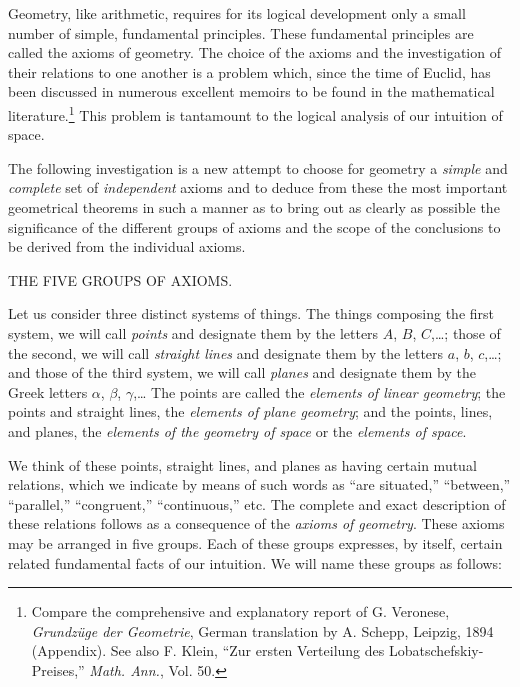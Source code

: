 \documentclass[11pt,oneside]{book}
\begin{document}
\pagestyle{headings}
\label{p0}

Geometry, like arithmetic, requires for its logical
development only a small number of simple,
fundamental principles. These fundamental principles
are called the axioms of geometry. The choice
of the axioms and the investigation of their relations
to one another is a problem which, since the time of
Euclid, has been discussed in numerous excellent
memoirs to be found in the mathematical literature.\footnote{Compare
the comprehensive and explanatory report of G. Veronese,
\textit{Grundz\"uge der Geometrie}, German translation by A. Schepp, Leipzig, 1894
(Appendix). See also F. Klein, ``Zur ersten Verteilung des Lobatschefskiy-Preises,''
\emph{Math. Ann.}, Vol. 50.}
This problem is tantamount to the logical analysis of
our intuition of space.

The following investigation is a new attempt to
choose for geometry a \emph{simple} and \emph{complete} set of \emph{independent}
axioms and to deduce from these the most important
geometrical theorems in such a manner as to
bring out as clearly as possible the significance of the
different groups of axioms and the scope of the conclusions
to be derived from the individual axioms.
\newpage
\begin{center}{\Large THE FIVE GROUPS OF AXIOMS.}\end{center}
\label{p1}

Let us consider three distinct systems of things.
The things composing the first system, we will
call \emph{points} and designate them by the letters $A$, $B$,
$C$,\ldots; those of the second, we will call \emph{straight
lines} and designate them by the letters $a$, $b$, $c$,\ldots;
and those of the third system, we will call \emph{planes} and
designate them by the Greek letters $\alpha$, $\beta$, $\gamma$,\ldots
The points are called the \emph{elements of linear geometry};
the points and straight lines, the \emph{elements of plane geometry};
and the points, lines, and planes, the \emph{elements
of the geometry of space} or the \emph{elements of space}.

We think of these points, straight lines, and planes
as having certain mutual relations, which we indicate
by means of such words as ``are situated,'' ``between,''
``parallel,'' ``congruent,'' ``continuous,'' etc.
The complete and exact description of these relations
follows as a consequence of the \emph{axioms of geometry}.
These axioms may be arranged in five groups. Each
of these groups expresses, by itself, certain related
fundamental facts of our intuition. We will name
these groups as follows:
\end{document}
